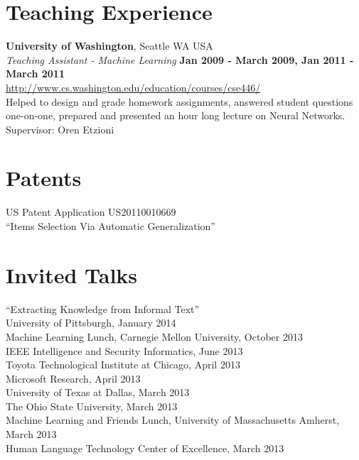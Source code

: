 \documentclass[margin,line]{res}
\begin{document}
\begin{resume}
\section{\sc Teaching Experience}

{\bf University of Washington}, Seattle WA USA\\
{\em Teaching Assistant - Machine Learning} \hfill {\bf Jan 2009 - March 2009, Jan 2011 - March 2011} \\
\url{http://www.cs.washington.edu/education/courses/cse446/} \\
Helped to design and grade homework assignments, answered student questions one-on-one, prepared and presented an hour long
lecture on Neural Networks. \\
Supervisor: Oren Etzioni

\begin{comment}
\section{\sc Mentoring}

{\em Sam Clark} \hfill {\bf March 2010 - June 2011} \\
Supervised Sam's work annotating a corpus of Tweets with Part of Speech (POS) and Chunk tags, and building a POS tagger and Chunker
for Tweets.  Sam is now working at a Seattle startup, {\em Decide.com}
\end{comment}

\section{\sc Patents}
US Patent Application US20110010669 \\
``Items Selection Via Automatic Generalization''

\section{\sc Invited Talks}
``Extracting Knowledge from Informal Text'' \\
University of Pittsburgh, January 2014 \\
Machine Learning Lunch, Carnegie Mellon University, October 2013 \\
IEEE Intelligence and Security Informatics, June 2013 \\
Toyota Technological Institute at Chicago, April 2013 \\
Microsoft Research, April 2013 \\
University of Texas at Dallas, March 2013 \\
The Ohio State University, March 2013 \\
Machine Learning and Friends Lunch, University of Massachusetts Amherst, March 2013 \\
Human Language Technology Center of Excellence, March 2013 \\


\end{resume}
\end{document}
